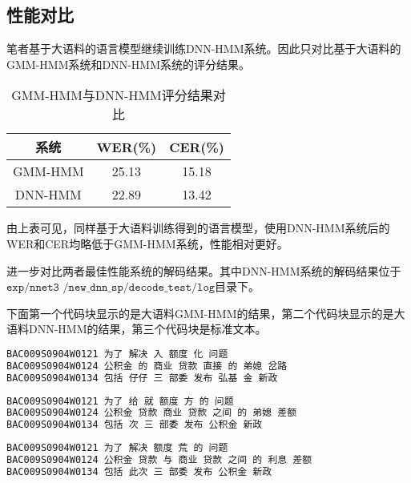 \documentclass[a4paper]{article}
\renewcommand{\tt}[1]{\mathtt{#1}}
\begin{document}

\subsection{性能对比}


笔者基于大语料的语言模型继续训练DNN-HMM系统。因此只对比基于大语料的GMM-HMM系统和DNN-HMM系统的评分结果。

\begin{table}[th]
  \centering
  \begin{tabular}{ c | c c }
    \toprule
    \textbf{系统} & \textbf{WER(\%)} & \textbf{CER(\%)} \\
    \midrule
    GMM-HMM & 25.13 & 15.18 \\
    DNN-HMM & 22.89 & 13.42 \\
    \bottomrule
  \end{tabular}
  \vspace{0.5em}
  \centering \caption{GMM-HMM与DNN-HMM评分结果对比}
  \label{tab2}
\end{table}

\vspace{-1em}
由上表可见，同样基于大语料训练得到的语言模型，使用DNN-HMM系统后的WER和CER均略低于GMM-HMM系统，性能相对更好。

\vspace{1em}
进一步对比两者最佳性能系统的解码结果。其中DNN-HMM系统的解码结果位于$\tt{exp/nnet3}$ $\tt{/new\_dnn\_sp/decode\_test/log}$目录下。

下面第一个代码块显示的是大语料GMM-HMM的结果，第二个代码块显示的是大语料DNN-HMM的结果，第三个代码块是标准文本。

\begin{lstlisting}[language=bash]
BAC009S0904W0121 为了 解决 入 额度 化 问题 
BAC009S0904W0124 公积金 的 商业 贷款 直接 的 弟媳 岔路 
BAC009S0904W0134 包括 仔仔 三 部委 发布 弘基 金 新政 
\end{lstlisting}
\begin{lstlisting}[language=bash]
BAC009S0904W0121 为了 给 就 额度 方 的 问题 
BAC009S0904W0124 公积金 贷款 商业 贷款 之间 的 弟媳 差额
BAC009S0904W0134 包括 次 三 部委 发布 公积金 新政 
\end{lstlisting}
\begin{lstlisting}[language=bash]
BAC009S0904W0121 为了 解决 额度 荒 的 问题 
BAC009S0904W0124 公积金 贷款 与 商业 贷款 之间 的 利息 差额 
BAC009S0904W0134 包括 此次 三 部委 发布 公积金 新政 \end{lstlisting}
\end{document}
